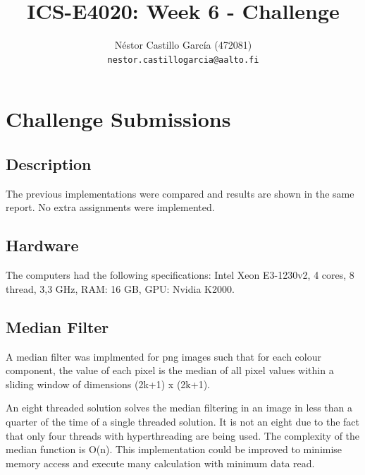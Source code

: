 \documentclass[a4paper,10pt]{article}
\title{ICS-E4020: Week 6 - Challenge}
\author{Néstor Castillo García (472081)\\ 
       {\tt nestor.castillogarcia@aalto.fi}}
\begin{document}
\maketitle

\section{Challenge Submissions}

\subsection{Description}

The previous implementations were compared and results are shown in the same report. No extra assignments were implemented.

\subsection{Hardware}
The computers had the following specifications: Intel Xeon E3-1230v2, 4 cores, 8 thread, 3,3 GHz, RAM: 16 GB, GPU: Nvidia K2000.


\subsection{Median Filter}
A median filter was implmented for png images such that for each colour component, the value of each pixel is the median of all pixel values within a sliding window of dimensions (2k+1) x (2k+1).

An eight threaded solution solves the median filtering in an image in less than a quarter of the time of a single threaded solution. It is not an eight due to the fact that only four threads with hyperthreading are being used. The complexity of the median function is O(n). This implementation could be improved to minimise memory access and execute many calculation with minimum data read.
\end{document}
